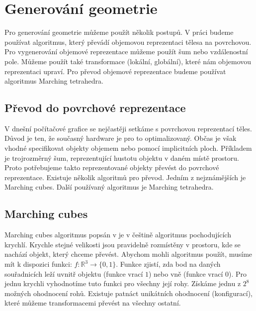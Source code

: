 
\section{Generování geometrie}
\label{sec:geometrie}

Pro generování geometrie můžeme použít několik postupů.
V práci budeme používat algoritmus, který převádí objemovou reprezentaci tělesa na povrchovou.
Pro vygenerování objemové reprezentace můžeme použít šum nebo vzdálenostní pole.
Můžeme použít také transformace (lokální, globální), které nám objemovou reprezentaci upraví.
Pro převod objemové reprezentace budeme používat algoritmus Marching tetrahedra.

\subsection{Převod do povrchové reprezentace}
V dnešní počítačové grafice se nejčastěji setkáme s povrchovou reprezentací těles.
Důvod je ten, že současný hardware je pro to optimalizovaný.
Občas je však vhodné specifikovat objekty objemem nebo pomocí implicitních ploch.
Příkladem je trojrozměrný šum, reprezentující hustotu objektu v daném místě prostoru.
Proto potřebujeme takto reprezentované objekty převést do povrchové reprezentace.
Existuje několik algoritmů pro převod.
Jedním z nejznámějších je Marching cubes.
Další používaný algoritmus je Marching tetrahedra.

\subsection{Marching cubes}
Marching cubes algoritmus popsán v \cite{MARCHINGCUBES} je v češtině algoritmus pochodujících krychlí.
Krychle stejné velikosti jsou pravidelně rozmístěny v prostoru, kde se nachází objekt, který chceme převést.
Abychom mohli algoritmus použít, musíme mít k dispozici funkci: $f: \mathbb{R}^3 \to \{0,1\} $.
Funkce zjistí, zda bod na daných souřadnicích leží uvnitř objektu (funkce vrací $1$) nebo vně (funkce vrací $0$).
Pro jednu krychli vyhodnotíme tuto funkci pro všechny její rohy.
Získáme jednu z $2^8$ možných ohodnocení rohů.
Existuje patnáct unikátních ohodnocení (konfigurací), které můžeme transformacemi převést na všechny ostatní.


